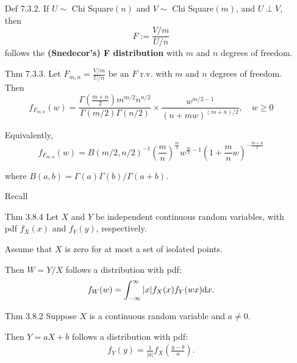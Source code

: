 \begin{frame}
\begin{enumerate}
\item[Def \small 7.3.2.] If $U\sim$ Chi Square$(n)$ and $V\sim$ Chi Square$(m)$, and $U\perp V$, then
\[
F:= \frac{V/m}{U/n}
\]
follows the \textcolor{yellow!80!black}{\bf (Snedecor's) F distribution} with $m$ and $n$ degrees of freedom.
\vfill
\item[Thm \small 7.3.3.] Let $F_{m,n}=\frac{V/m}{U/n}$ be an $F$ r.v. with $m$ and $n$ degrees of freedom. Then
\[
	f_{F_{m,n}}(w) =
	\frac{\Gamma\left(\frac{m+n}{2}\right)m^{m/2}n^{n/2}}{\Gamma(m/2)\Gamma(n/2)} \times
	\frac{w^{m/2-1}}{(n+mw)^{(m+n)/2}}, \quad w\ge 0
\]
\item[] Equivalently,
\[
	f_{F_{m,n}}(w)
	=
	B(m/2,n/2)^{-1} \left(\frac{m}{n} \right)^{\frac{m}{2}} w^{\frac{m}{2}-1}\left( 1+\frac{m}{n}w \right)^{-\frac{m+n}{2}}
\]
\item[] where $B(a,b)=\Gamma(a)\Gamma(b)/\Gamma(a+b)$.
\end{enumerate}
\end{frame}
\begin{frame}
\begin{enumerate}
	\item[Recall] \phantom{a}\\
	\vfill
	\item[Thm \small 3.8.4] Let $X$ and $Y$ be independent continuous random variables, with
		pdf $f_X(x)$ and $f_Y(y)$, respectively.
	\item[] Assume that $X$ is zero for at most a set of isolated points.
	\item[] Then $W=Y/X$ follows a distribution with pdf:
		\begin{align*}
			f_W(w) = \int_{-\infty}^\infty |x| f_X(x) f_Y(wx) \mathrm{d} x.
		\end{align*}
		\vfill
	\item[Thm \small 3.8.2] Suppose $X$ is a continuous random variable and $a\ne 0$.
	\item[] Then $Y=aX+b$ follows a distribution with pdf:
		\begin{align*}
			f_Y(y) = \frac{1}{|a|} f_X\left(\frac{y-b}{a}\right).
		\end{align*}
\end{enumerate}
\end{frame}
